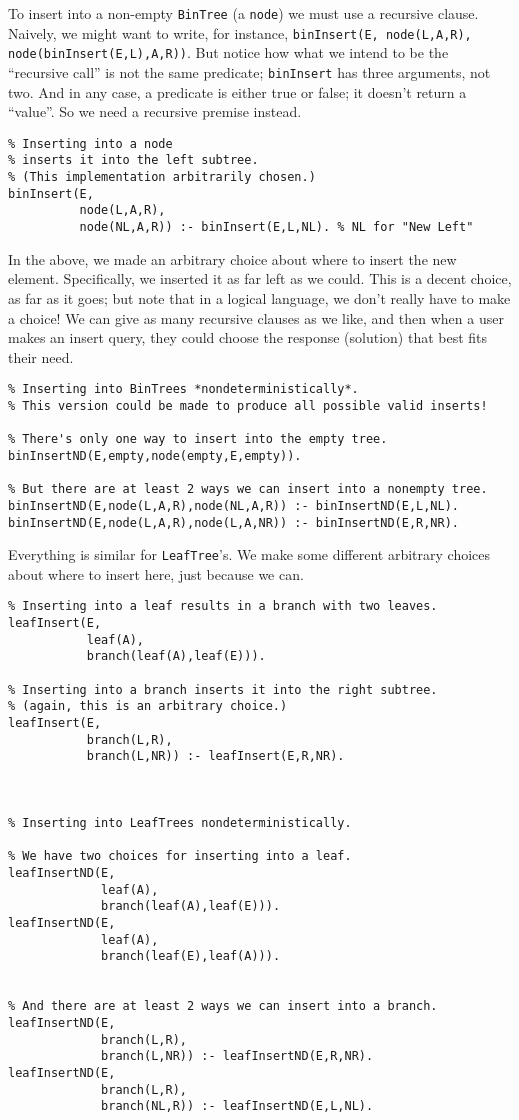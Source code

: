 \documentclass[11pt]{article}
\begin{document}
To insert into a non-empty \texttt{BinTree} (a \texttt{node})
we must use a recursive clause.
Naively, we might want to write,
for instance, \texttt{binInsert(E, node(L,A,R), node(binInsert(E,L),A,R))}.
But notice how what we intend to be the “recursive call”
is not the same predicate; \texttt{binInsert} has three arguments, not two.
And in any case, a predicate is either true or false;
it doesn't return a “value”.
So we need a recursive premise instead.
\begin{verbatim}
% Inserting into a node
% inserts it into the left subtree.
% (This implementation arbitrarily chosen.)
binInsert(E,
          node(L,A,R),
          node(NL,A,R)) :- binInsert(E,L,NL). % NL for "New Left" 
\end{verbatim}

In the above, we made an arbitrary choice about where to insert
the new element. Specifically, we inserted it as far left
as we could. This is a decent choice, as far as it goes;
but note that in a logical language, we don't really have to make a choice!
We can give as many recursive clauses as we like,
and then when a user makes an insert query, they could choose
the response (solution) that best fits their need.
\begin{verbatim}
% Inserting into BinTrees *nondeterministically*.
% This version could be made to produce all possible valid inserts!

% There's only one way to insert into the empty tree.
binInsertND(E,empty,node(empty,E,empty)).

% But there are at least 2 ways we can insert into a nonempty tree.
binInsertND(E,node(L,A,R),node(NL,A,R)) :- binInsertND(E,L,NL).
binInsertND(E,node(L,A,R),node(L,A,NR)) :- binInsertND(E,R,NR).
\end{verbatim}

Everything is similar for \texttt{LeafTree}'s.
We make some different arbitrary choices about where to insert here,
just because we can.
\begin{verbatim}
% Inserting into a leaf results in a branch with two leaves.
leafInsert(E,
           leaf(A),
           branch(leaf(A),leaf(E))).

% Inserting into a branch inserts it into the right subtree.
% (again, this is an arbitrary choice.)
leafInsert(E,
           branch(L,R),
           branch(L,NR)) :- leafInsert(E,R,NR).



% Inserting into LeafTrees nondeterministically.

% We have two choices for inserting into a leaf.
leafInsertND(E,
             leaf(A),
             branch(leaf(A),leaf(E))).
leafInsertND(E,
             leaf(A),
             branch(leaf(E),leaf(A))).


% And there are at least 2 ways we can insert into a branch.
leafInsertND(E,
             branch(L,R),
             branch(L,NR)) :- leafInsertND(E,R,NR).
leafInsertND(E,
             branch(L,R),
             branch(NL,R)) :- leafInsertND(E,L,NL).
\end{verbatim}
\end{document}
